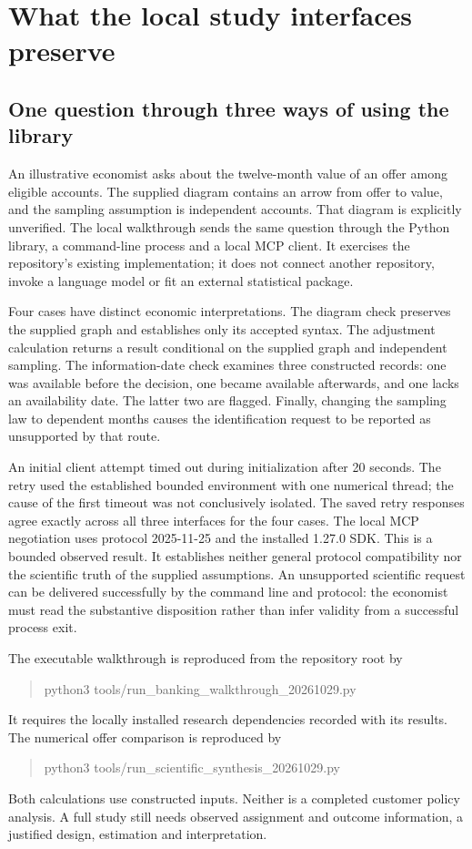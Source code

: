 \chapter{What the local study interfaces preserve}
\label{scisyn:investment}

\section{One question through three ways of using the library}
An illustrative economist asks about the twelve-month value of an offer among
eligible accounts. The supplied diagram contains an arrow from offer to value,
and the sampling assumption is independent accounts. That diagram is explicitly
unverified. The local walkthrough sends the same question through the Python
library, a command-line process and a local MCP client. It exercises the
repository's existing implementation; it does not connect another repository,
invoke a language model or fit an external statistical package.

Four cases have distinct economic interpretations. The diagram check preserves
the supplied graph and establishes only its accepted syntax. The adjustment
calculation returns a result conditional on the supplied graph and independent
sampling. The information-date check examines three constructed records:
one was available before the decision, one became available afterwards, and
one lacks an availability date. The latter two are flagged. Finally, changing
the sampling law to dependent months causes the identification request to be
reported as unsupported by that route.

An initial client attempt timed out during initialization after 20 seconds.
The retry used the established bounded environment with one numerical thread;
the cause of the first timeout was not conclusively isolated.
The saved retry responses agree exactly across all three interfaces for the four
cases. The local MCP negotiation uses protocol 2025-11-25 and the installed
1.27.0 SDK. This is a bounded observed result. It establishes neither general
protocol compatibility nor the scientific truth of the supplied assumptions.
An unsupported scientific request can be delivered successfully by the command
line and protocol: the economist must read the substantive disposition rather
than infer validity from a successful process exit.

The executable walkthrough is reproduced from the repository root by
\begin{quote}\small\ttfamily
python3 tools/run\_banking\_walkthrough\_20261029.py
\end{quote}
It requires the locally installed research dependencies recorded with its
results. The numerical offer comparison is reproduced by
\begin{quote}\small\ttfamily
python3 tools/run\_scientific\_synthesis\_20261029.py
\end{quote}
Both calculations use constructed inputs. Neither is a completed customer
policy analysis. A full study still needs observed assignment and outcome
information, a justified design, estimation and interpretation.


